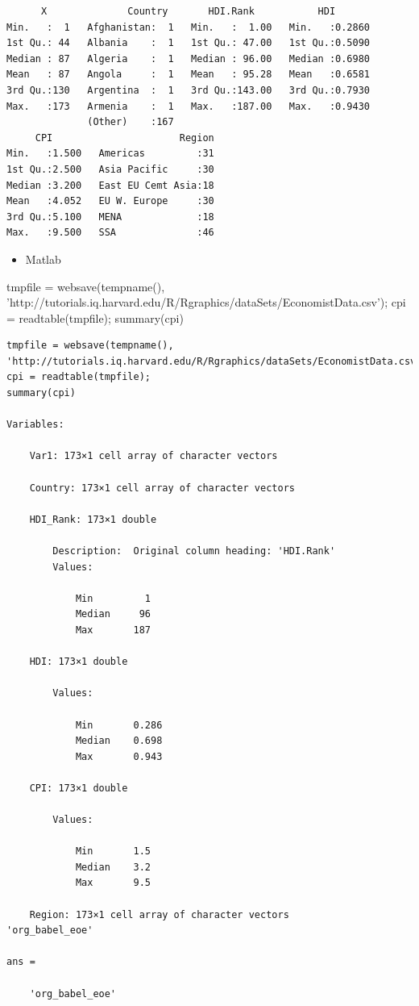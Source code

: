 \documentclass[]{book}
\newenvironment{Shaded}{\begin{snugshade}}{\end{snugshade}}
\newcommand{\StringTok}[1]{\textcolor[rgb]{0.31,0.60,0.02}{#1}}
\newcommand{\NormalTok}[1]{#1}
\providecommand{\tightlist}{%
  \setlength{\itemsep}{0pt}\setlength{\parskip}{0pt}}
\begin{document}
\begin{verbatim}
      X              Country       HDI.Rank           HDI        
Min.   :  1   Afghanistan:  1   Min.   :  1.00   Min.   :0.2860  
1st Qu.: 44   Albania    :  1   1st Qu.: 47.00   1st Qu.:0.5090  
Median : 87   Algeria    :  1   Median : 96.00   Median :0.6980  
Mean   : 87   Angola     :  1   Mean   : 95.28   Mean   :0.6581  
3rd Qu.:130   Argentina  :  1   3rd Qu.:143.00   3rd Qu.:0.7930  
Max.   :173   Armenia    :  1   Max.   :187.00   Max.   :0.9430  
              (Other)    :167                                    
     CPI                      Region  
Min.   :1.500   Americas         :31  
1st Qu.:2.500   Asia Pacific     :30  
Median :3.200   East EU Cemt Asia:18  
Mean   :4.052   EU W. Europe     :30  
3rd Qu.:5.100   MENA             :18  
Max.   :9.500   SSA              :46
\end{verbatim}

\begin{itemize}
\tightlist
\item
  Matlab
\end{itemize}

\begin{Shaded}
\begin{Highlighting}[]
\NormalTok{tmpfile = websave(tempname(), }\StringTok{'http://tutorials.iq.harvard.edu/R/Rgraphics/dataSets/EconomistData.csv'}\NormalTok{);}
\NormalTok{cpi = readtable(tmpfile);}
\NormalTok{summary(cpi)}
\end{Highlighting}
\end{Shaded}

\begin{verbatim}
tmpfile = websave(tempname(), 'http://tutorials.iq.harvard.edu/R/Rgraphics/dataSets/EconomistData.csv');
cpi = readtable(tmpfile);
summary(cpi)

Variables:

    Var1: 173×1 cell array of character vectors

    Country: 173×1 cell array of character vectors

    HDI_Rank: 173×1 double

        Description:  Original column heading: 'HDI.Rank'
        Values:

            Min         1       
            Median     96       
            Max       187       

    HDI: 173×1 double

        Values:

            Min       0.286
            Median    0.698
            Max       0.943

    CPI: 173×1 double

        Values:

            Min       1.5  
            Median    3.2  
            Max       9.5  

    Region: 173×1 cell array of character vectors
'org_babel_eoe'

ans =

    'org_babel_eoe'
\end{verbatim}
\end{document}
